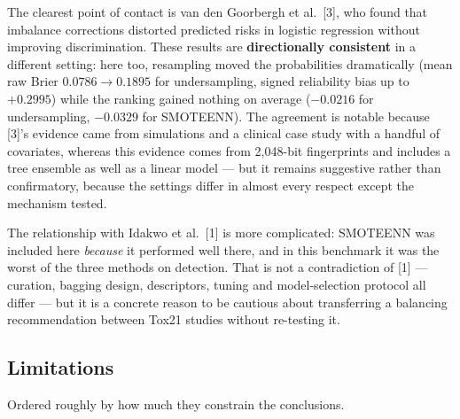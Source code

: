 \documentclass[10pt,letterpaper]{article}
\begin{document}
The clearest point of contact is van den Goorbergh et al.~[3], who found that imbalance corrections
distorted predicted risks in logistic regression without improving discrimination. These results are
\textbf{directionally consistent} in a different setting: here too, resampling moved the probabilities
dramatically (mean raw Brier $0.0786 \to 0.1895$ for undersampling, signed reliability bias up to
$+0.2995$) while the ranking gained nothing on average ($-0.0216$ for undersampling, $-0.0329$ for
SMOTEENN). The agreement is notable because [3]'s evidence came from simulations and a clinical case
study with a handful of covariates, whereas this evidence comes from 2{,}048-bit fingerprints and
includes a tree ensemble as well as a linear model --- but it remains suggestive rather than
confirmatory, because the settings differ in almost every respect except the mechanism tested.

The relationship with Idakwo et al.~[1] is more complicated: SMOTEENN was included here
\emph{because} it performed well there, and in this benchmark it was the worst of the three methods
on detection. That is not a contradiction of [1] --- curation, bagging design, descriptors, tuning
and model-selection protocol all differ --- but it is a concrete reason to be cautious about
transferring a balancing recommendation between Tox21 studies without re-testing it.

\subsection{Limitations}

Ordered roughly by how much they constrain the conclusions.
\end{document}
